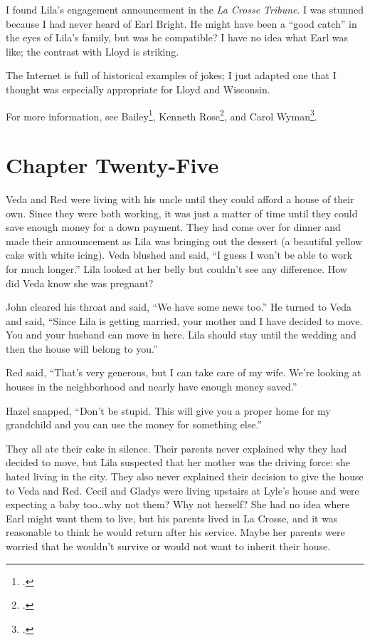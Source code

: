 \documentclass[
  letterpaper,
]{book}
\begin{document}
I found Lila's engagement announcement in the \emph{La Crosse Tribune}.
I was stunned because I had never heard of Earl Bright. He might have
been a ``good catch'' in the eyes of Lila's family, but was he
compatible? I have no idea what Earl was like; the contrast with Lloyd
is striking.

The Internet is full of historical examples of jokes; I just adapted one
that I thought was especially appropriate for Lloyd and Wisconsin.

For more information, see Bailey\footnote{.}, Kenneth Rose\footnote{.}, and Carol Wyman\footnote{.}.


\chapter{Chapter Twenty-Five}\label{chapter-twenty-five}

Veda and Red were living with his uncle until they could afford a house
of their own. Since they were both working, it was just a matter of time
until they could save enough money for a down payment. They had come
over for dinner and made their announcement as Lila was bringing out the
dessert (a beautiful yellow cake with white icing). Veda blushed and
said, ``I guess I won't be able to work for much longer.'' Lila looked
at her belly but couldn't see any difference. How did Veda know she was
pregnant?

John cleared his throat and said, ``We have some news too.'' He turned
to Veda and said, ``Since Lila is getting married, your mother and I
have decided to move. You and your husband can move in here. Lila should
stay until the wedding and then the house will belong to you.''

Red said, ``That's very generous, but I can take care of my wife. We're
looking at houses in the neighborhood and nearly have enough money
saved.''

Hazel snapped, ``Don't be stupid. This will give you a proper home for
my grandchild and you can use the money for something else.''

They all ate their cake in silence. Their parents never explained why
they had decided to move, but Lila suspected that her mother was the
driving force: she hated living in the city. They also never explained
their decision to give the house to Veda and Red. Cecil and Gladys were
living upstairs at Lyle's house and were expecting a baby too\ldots why
not them? Why not herself? She had no idea where Earl might want them to
live, but his parents lived in La Crosse, and it was reasonable to think
he would return after his service. Maybe her parents were worried that
he wouldn't survive or would not want to inherit their house.
\end{document}
